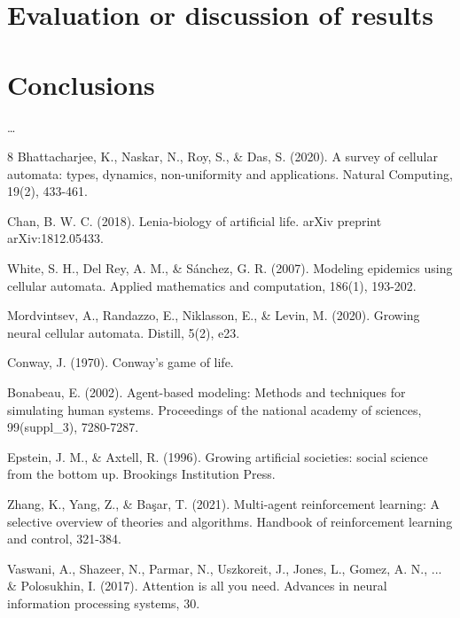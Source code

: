 \documentclass[runningheads]{llncs}
\begin{document}
\section{Evaluation or discussion of results}
\label{sec:evaluacion}

\section{Conclusions}
\label{sec:conclusiones}

\dots

\begin{thebibliography}{8}
Bhattacharjee, K., Naskar, N., Roy, S., \& Das, S. (2020). A survey of cellular automata: types, dynamics, non-uniformity and applications. Natural Computing, 19(2), 433-461.

Chan, B. W. C. (2018). Lenia-biology of artificial life. arXiv preprint arXiv:1812.05433. 

White, S. H., Del Rey, A. M., \& Sánchez, G. R. (2007). Modeling epidemics using cellular automata. Applied mathematics and computation, 186(1), 193-202. 

Mordvintsev, A., Randazzo, E., Niklasson, E., \& Levin, M. (2020). Growing neural cellular automata. Distill, 5(2), e23. 

Conway, J. (1970). Conway’s game of life. \doi{}

Bonabeau, E. (2002). Agent-based modeling: Methods and techniques for simulating human systems. Proceedings of the national academy of sciences, 99(suppl\_3), 7280-7287. 

Epstein, J. M., \& Axtell, R. (1996). Growing artificial societies: social science from the bottom up. Brookings Institution Press.

Zhang, K., Yang, Z., \& Başar, T. (2021). Multi-agent reinforcement learning: A selective overview of theories and algorithms. Handbook of reinforcement learning and control, 321-384. 

Vaswani, A., Shazeer, N., Parmar, N., Uszkoreit, J., Jones, L., Gomez, A. N., ... \& Polosukhin, I. (2017). Attention is all you need. Advances in neural information processing systems, 30.


\end{thebibliography}
\end{document}
